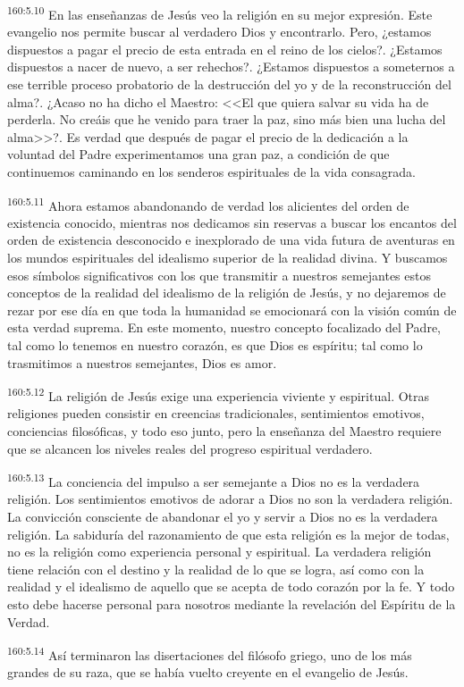 \par 
\textsuperscript{160:5.10} En las enseñanzas de Jesús veo la religión en su mejor expresión. Este evangelio nos permite buscar al verdadero Dios y encontrarlo. Pero, ¿estamos dispuestos a pagar el precio de esta entrada en el reino de los cielos?. ¿Estamos dispuestos a nacer de nuevo, a ser rehechos?. ¿Estamos dispuestos a someternos a ese terrible proceso probatorio de la destrucción del yo y de la reconstrucción del alma?. ¿Acaso no ha dicho el Maestro: <<El que quiera salvar su vida ha de perderla. No creáis que he venido para traer la paz, sino más bien una lucha del alma>>?. Es verdad que después de pagar el precio de la dedicación a la voluntad del Padre experimentamos una gran paz, a condición de que continuemos caminando en los senderos espirituales de la vida consagrada.

\par 
\textsuperscript{160:5.11} Ahora estamos abandonando de verdad los alicientes del orden de existencia conocido, mientras nos dedicamos sin reservas a buscar los encantos del orden de existencia desconocido e inexplorado de una vida futura de aventuras en los mundos espirituales del idealismo superior de la realidad divina. Y buscamos esos símbolos significativos con los que transmitir a nuestros semejantes estos conceptos de la realidad del idealismo de la religión de Jesús, y no dejaremos de rezar por ese día en que toda la humanidad se emocionará con la visión común de esta verdad suprema. En este momento, nuestro concepto focalizado del Padre, tal como lo tenemos en nuestro corazón, es que Dios es espíritu; tal como lo trasmitimos a nuestros semejantes, Dios es amor.

\par 
\textsuperscript{160:5.12} La religión de Jesús exige una experiencia viviente y espiritual. Otras religiones pueden consistir en creencias tradicionales, sentimientos emotivos, conciencias filosóficas, y todo eso junto, pero la enseñanza del Maestro requiere que se alcancen los niveles reales del progreso espiritual verdadero.

\par 
\textsuperscript{160:5.13} La conciencia del impulso a ser semejante a Dios no es la verdadera religión. Los sentimientos emotivos de adorar a Dios no son la verdadera religión. La convicción consciente de abandonar el yo y servir a Dios no es la verdadera religión. La sabiduría del razonamiento de que esta religión es la mejor de todas, no es la religión como experiencia personal y espiritual. La verdadera religión tiene relación con el destino y la realidad de lo que se logra, así como con la realidad y el idealismo de aquello que se acepta de todo corazón por la fe. Y todo esto debe hacerse personal para nosotros mediante la revelación del Espíritu de la Verdad.

\par 
\textsuperscript{160:5.14} Así terminaron las disertaciones del filósofo griego, uno de los más grandes de su raza, que se había vuelto creyente en el evangelio de Jesús.